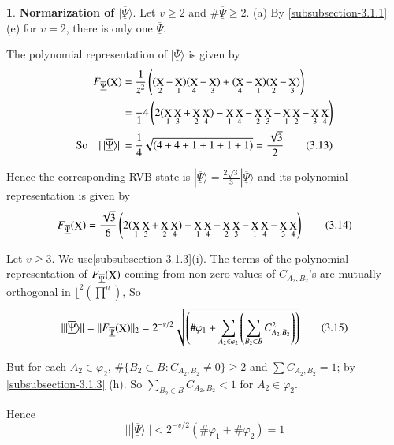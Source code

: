 \documentclass[a4paper,12pt]{article}
\DeclareMathOperator{\x}{\mathrm{X}}
\theoremstyle{definition}
\theoremstyle{underlinethm}
\theoremstyle{definition}
\newtheorem{subsubsec}{}[subsection]
\begin{document}
\begin{subsubsec}\label{subsubsection-3.1.4}
{\bf Normarization of $| \underline{\overline{\Psi}} \rangle$}. Let $v \geq 2$ and $\# \underline{\overline{\Psi}} \geq 2 $. (a) By \eqref{subsubsection-3.1.1} (e) for $v=2$, there is only one $\underline{\overline{\Psi}}$. 

The polynomial representation of $| \underline{\overline{\Psi}} \rangle$ is given by
\begin{align*}
F_{\underline{\overline{\Psi}}} (\bold{\x}) &= \frac{1}{z^{2}}\left((\x_{2} - \x_{1}) (\x_{4} - \x_{3}) + (\x_{4}-\x_{1}) (\x_{2}-\x_{3})\right)\\
 &= \frac{}1{4} \left(2(\x_{1} \x_{3} + \x_{2} \x_{4}) - \x_{1} \x_{4}- \x_{2}\x_{3} -\x_{1}\x_{2}-\x_{3}\x_{4}\right)\\
\text{So} \quad || | \underline{\overline{\Psi}} \rangle || &= \frac{1}{4} \sqrt{\left(4+4+1+1+1+1\right)} = \frac{\sqrt{3}}{2}\tag{3.13}
\end{align*}

Hence the corresponding RVB state is $| \underline{\overline{\Psi}} \rangle  = \frac{2\sqrt{3}}{3} | \underline{\overline{\Psi}} \rangle$ and its polynomial representation is given by 
\begin{equation*}
F_{\underline{\overline{\Psi}}}(\bold{\x}) = \frac{\sqrt{3}}{6} \left(2(\x_{1}\x_{3} + \x_{2}\x_{4}) - \x_{1}\x_{4} - \x_{2}\x_{3}- \x_{1}\x_{4} -\x_{3}\x_{4}\right)\tag{3.14}
\end{equation*}

Let $v\geq 3$. We use\eqref{subsubsection-3.1.3}(i). The terms of the polynomial representation of $F_{\underline{\overline{\Psi}}}(\bold{\x})$ coming from non-zero values of $C_{A_{2}, B_{2}}$'s are mutually orthogonal in $\lfloor^{2}\left(\prod^{n}\right)$, So
\begin{equation*}
|| | \underline{\overline{\Psi}} \rangle || = ||F_{\underline{\overline{\Psi}}}(\bold{\x})||_{2} = 2^{-v/2}\sqrt{\left(\# \varphi_{1}  + \sum_{A_{2} \in \varphi_{2}} \left(\sum_{B_{2} \subset B} C_{A_{2}, B_{2}}^{2}\right) \right)}\tag{3.15}
\end{equation*}

But for each $A_{2} \in \varphi_{2}$, $\# \{B_{2} \subset B  : C_{A_{2}, B_{2}} \neq 0\} \geq 2$ and $\sum C_{A_{2}, B_{2}} = 1$; by \eqref{subsubsection-3.1.3} (h). So $\sum_{B_{2} \in B} C_{A_{2}, B_{2}} < 1$ for $A_{2} \in \varphi_{2}$.

Hence
\begin{equation*}
|| | \underline{\overline{\Psi}} \rangle || < 2^{-v/2} (\# \varphi_{1} + \# \varphi_{2}) =1\tag{3.16}
\end{equation*}


\end{subsubsec}
\end{document}
